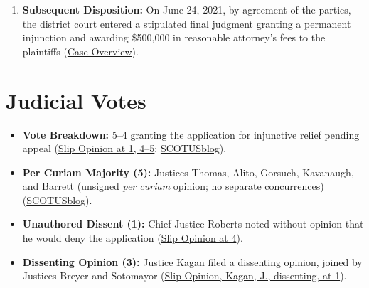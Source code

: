 \documentclass[12pt]{article}
\begin{document}
\begin{enumerate}
\item \textbf{Subsequent Disposition:} On June 24, 2021, by agreement of the parties, the district court entered a stipulated final judgment granting a permanent injunction and awarding \$500,000 in reasonable attorney's fees to the plaintiffs (\href{https://en.wikipedia.org/wiki/Tandon_v._Newsom}{Case Overview}).
\end{enumerate}

\section{Judicial Votes}
\begin{itemize}
\item \textbf{Vote Breakdown:} 5--4 granting the application for injunctive relief pending appeal (\href{https://www.supremecourt.gov/opinions/20pdf/20a151_4g15.pdf}{Slip Opinion at 1, 4--5}; \href{https://www.scotusblog.com/2021/04/tandon-steals-fultons-thunder-the-most-important-free-exercise-decision-since-1990/}{SCOTUSblog}).
\item \textbf{Per Curiam Majority (5):} Justices Thomas, Alito, Gorsuch, Kavanaugh, and Barrett (unsigned \textit{per curiam} opinion; no separate concurrences) (\href{https://www.scotusblog.com/2021/04/tandon-steals-fultons-thunder-the-most-important-free-exercise-decision-since-1990/}{SCOTUSblog}).
\item \textbf{Unauthored Dissent (1):} Chief Justice Roberts noted without opinion that he would deny the application (\href{https://www.supremecourt.gov/opinions/20pdf/20a151_4g15.pdf}{Slip Opinion at 4}).
\item \textbf{Dissenting Opinion (3):} Justice Kagan filed a dissenting opinion, joined by Justices Breyer and Sotomayor (\href{https://www.supremecourt.gov/opinions/20pdf/20a151_4g15.pdf}{Slip Opinion, Kagan, J., dissenting, at 1}).
\end{itemize}
\end{document}
